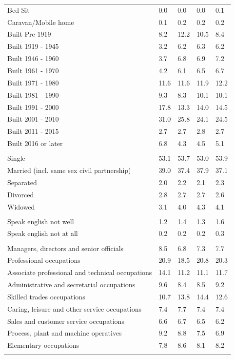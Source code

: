 \documentclass{article}
\begin{document}
\begin{table}[h]
\begin{tabular}{KTTTT}
Bed-Sit & 0.0& 0.0& 0.0& 0.1\\
Caravan/Mobile home & 0.1& 0.2& 0.2& 0.2\\
    \hline
Built Pre 1919 &  8.2& 12.2& 10.5&  8.4\\
Built 1919 - 1945 & 3.2& 6.2& 6.3& 6.2\\
Built  1946 - 1960 & 3.7& 6.8& 6.9& 7.2\\
Built  1961 - 1970 & 4.2& 6.1& 6.5& 6.7\\
Built  1971 - 1980 & 11.6& 11.6& 11.9& 12.2\\
Built  1981 - 1990 &  9.3&  8.3& 10.1& 10.1\\
Built  1991 - 2000 & 17.8& 13.3& 14.0& 14.5\\
Built  2001 - 2010 & 31.0& 25.8& 24.1& 24.5\\
Built  2011 - 2015 & 2.7& 2.7& 2.8& 2.7\\
Built  2016 or later & 6.8& 4.3& 4.5& 5.1\\
\hline
    \\
    \hline
Single & 53.1& 53.7& 53.0& 53.9\\
Married (incl. same sex civil partnership) & 39.0& 37.4& 37.9& 37.1\\
Separated  & 2.0& 2.2& 2.1& 2.3\\
Divorced  & 2.8& 2.7& 2.7& 2.6\\
Widowed & 3.1& 4.0& 4.3& 4.1\\
\hline
    \\ 
    \hline
Speak english not well & 1.2& 1.4& 1.3& 1.6\\
Speak english not at all & 0.2& 0.2& 0.2& 0.3\\
\hline
    \\
    \hline
Managers, directors and senior officials & 8.5& 6.8& 7.3& 7.7\\
Professional occupations & 20.9& 18.5& 20.8& 20.3\\
Associate professional and technical occupations & 14.1& 11.2& 11.1& 11.7\\
Administrative and secretarial occupations & 9.6& 8.4& 8.5& 9.2\\
Skilled trades occupations & 10.7& 13.8& 14.4& 12.6\\
Caring, leisure and other service occupations & 7.4& 7.7& 7.4& 7.4\\
Sales and customer service occupations & 6.6& 6.7& 6.5& 6.2\\
Process, plant and machine operatives & 9.2& 8.8& 7.5& 6.9\\
Elementary occupations & 7.8& 8.6& 8.1& 8.2\\
\hline
\end{tabular}
\end{table}
\end{document}
